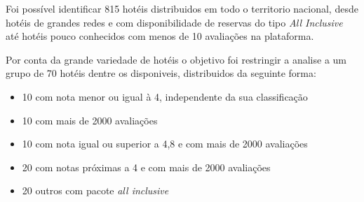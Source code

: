 Foi possível identificar 815 hotéis distribuidos em todo o territorio nacional, desde hotéis de grandes redes e com disponibilidade de reservas do tipo \emph{All Inclusive} até hotéis pouco conhecidos com menos de 10 avaliações na plataforma.








Por conta da grande variedade de hotéis o objetivo foi restringir a analise a um grupo de 70 hotéis dentre os disponiveis, distribuidos da seguinte forma:

\begin{itemize}
  \item 10 com nota menor ou igual à 4, independente da sua classificação
  \item 10 com mais de 2000 avaliações
  \item 10 com nota igual ou superior a 4,8 e com mais de 2000 avaliações
  \item 20 com notas próximas a 4 e com mais de 2000 avaliações
  \item 20 outros com pacote \emph{all inclusive}
\end{itemize}


